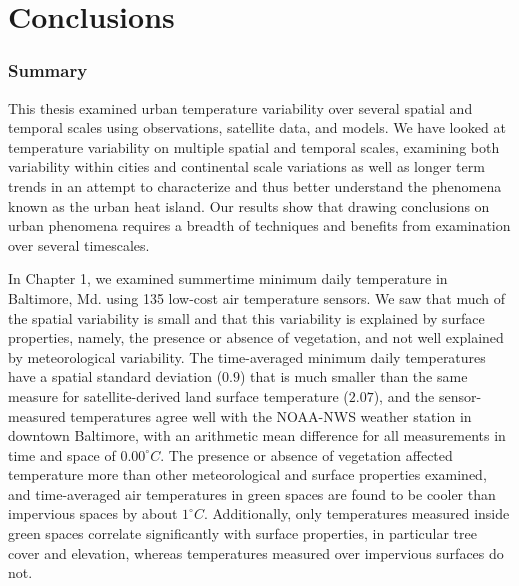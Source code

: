 \chapter{Conclusions}
\label{chap:conclusion}
\subsection{Summary}
This thesis examined urban temperature variability over several spatial and temporal scales using observations, satellite data, and models. 
We have looked at temperature variability on multiple spatial and temporal scales, examining both variability within cities and continental scale variations as well as longer term trends in an attempt to characterize and thus better understand the phenomena known as the urban heat island.
 Our results show that drawing conclusions on urban phenomena requires a breadth of techniques and benefits from examination over several timescales.  
 
In Chapter 1, we examined summertime minimum daily temperature in Baltimore, Md. using 135 low-cost air temperature sensors. We saw that much of the spatial variability is small and that this variability is explained by surface properties, namely, the presence or absence of vegetation, and not well explained by meteorological variability. The time-averaged minimum daily temperatures have a spatial standard deviation ($0.9$) that is much smaller than the same measure for satellite-derived land surface temperature ($2.07$), and the sensor-measured temperatures agree well with the NOAA-NWS weather station in downtown Baltimore, with an arithmetic mean difference for all measurements in time and space of $0.00^{\circ}C$. The presence or absence of vegetation affected temperature more than other meteorological and surface properties examined, and time-averaged air temperatures in green spaces are found to be cooler than impervious spaces by about $1^{\circ} C$. Additionally, only temperatures measured inside green spaces correlate significantly with surface properties, in particular tree cover and elevation, whereas temperatures measured over impervious surfaces do not. 

